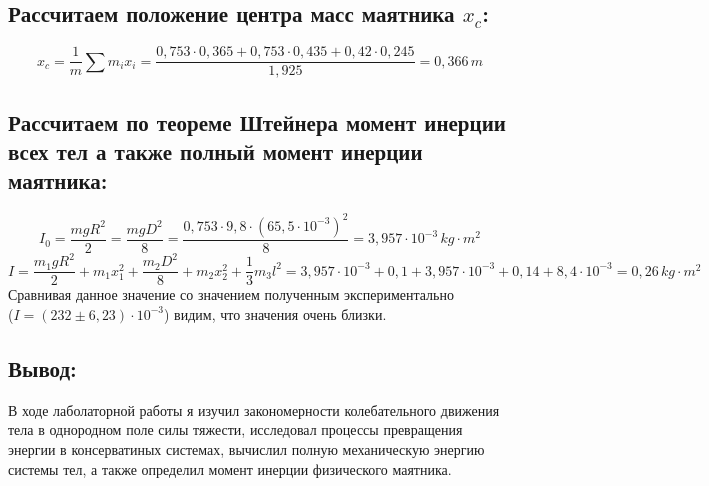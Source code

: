 \documentclass[a4paper,12pt]{report}
\begin{document}
\subsection*{Рассчитаем положение центра масс маятника $x_c$:}

\[ x_c = \frac{1}{m}\sum m_i x_i = \frac{0,753\cdot 0,365 + 0,753\cdot 0,435 + 0,42 \cdot 0,245 }{1,925} = 0,366 \, m \]

\subsection*{Рассчитаем по теореме Штейнера момент инерции всех тел а также полный момент инерции маятника:}

\[ I_0 = \frac{mgR^2}{2} = \frac{mgD^2}{8} = \frac{0,753 \cdot 9,8 \cdot (65,5 \cdot 10^{-3})^2}{8} = 3,957 \cdot 10^{-3} \, kg\cdot m^2 \]
\[ I = \frac{m_1gR^2}{2} + m_1x_1^2 + \frac{m_2D^2}{8} + m_2x_2^2 + \frac{1}{3}m_3l^2 = 3,957\cdot 10^{-3} + 0,1 + 3,957\cdot 10^{-3} + 0,14 + 8,4\cdot 10^{-3} = 0,26 \, kg\cdot m^2\]
Сравнивая данное значение со значением полученным экспериментально\\
($I = (232\pm6,23)\cdot 10^{-3}$) видим, что значения очень близки.

\subsection*{Вывод:}
В ходе лаболаторной работы я изучил закономерности колебательного движения тела в однородном поле силы тяжести, исследовал процессы превращения энергии в консерватиных системах, вычислил полную механическую энергию системы тел, а также определил момент инерции физического маятника.
\end{document}
